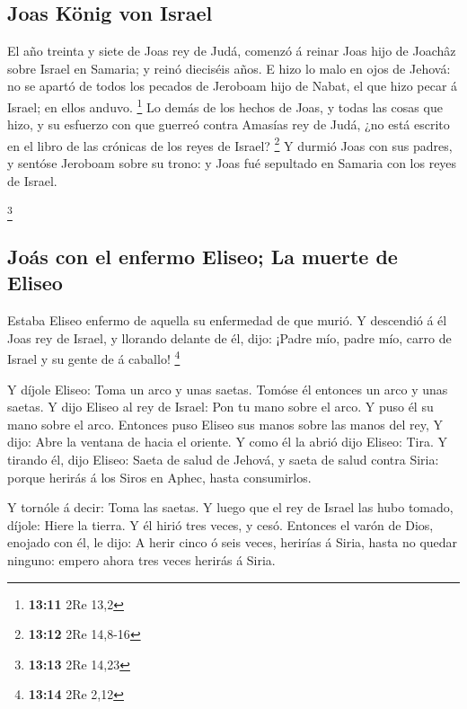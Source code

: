 \hypertarget{joas-kuxf6nig-von-israel}{%
\subsection{Joas König von Israel}\label{joas-kuxf6nig-von-israel}}

 El año treinta y siete de Joas rey de Judá, comenzó á
reinar Joas hijo de Joachâz sobre Israel en Samaria; y reinó dieciséis
años.  E hizo lo malo en ojos de Jehová: no se apartó de
todos los pecados de Jeroboam hijo de Nabat, el que hizo pecar á Israel;
en ellos anduvo. \footnote{\textbf{13:11} 2Re 13,2}  Lo
demás de los hechos de Joas, y todas las cosas que hizo, y su esfuerzo
con que guerreó contra Amasías rey de Judá, ¿no está escrito en el libro
de las crónicas de los reyes de Israel? \footnote{\textbf{13:12} 2Re
  14,8-16}  Y durmió Joas con sus padres, y sentóse
Jeroboam sobre su trono: y Joas fué sepultado en Samaria con los reyes
de Israel.

\footnote{\textbf{13:13} 2Re 14,23}

\hypertarget{jouxe1s-con-el-enfermo-eliseo-la-muerte-de-eliseo}{%
\subsection{Joás con el enfermo Eliseo; La muerte de
Eliseo}\label{jouxe1s-con-el-enfermo-eliseo-la-muerte-de-eliseo}}

 Estaba Eliseo enfermo de aquella su enfermedad de que
murió. Y descendió á él Joas rey de Israel, y llorando delante de él,
dijo: ¡Padre mío, padre mío, carro de Israel y su gente de á caballo!
\footnote{\textbf{13:14} 2Re 2,12}

 Y díjole Eliseo: Toma un arco y unas saetas. Tomóse él
entonces un arco y unas saetas.  Y dijo Eliseo al rey de
Israel: Pon tu mano sobre el arco. Y puso él su mano sobre el arco.
Entonces puso Eliseo sus manos sobre las manos del rey, 
Y dijo: Abre la ventana de hacia el oriente. Y como él la abrió dijo
Eliseo: Tira. Y tirando él, dijo Eliseo: Saeta de salud de Jehová, y
saeta de salud contra Siria: porque herirás á los Siros en Aphec, hasta
consumirlos.

 Y tornóle á decir: Toma las saetas. Y luego que el rey
de Israel las hubo tomado, díjole: Hiere la tierra. Y él hirió tres
veces, y cesó.  Entonces el varón de Dios, enojado con
él, le dijo: A herir cinco ó seis veces, herirías á Siria, hasta no
quedar ninguno: empero ahora tres veces herirás á Siria.

